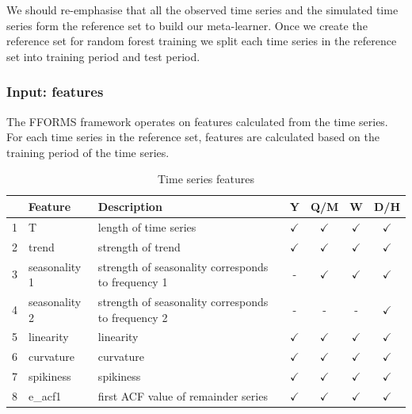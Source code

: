 \documentclass[11pt,a4paper,]{article}
\def\yes{$\checkmark$}
\begin{document}
We should re-emphasise that all the observed time series and the
simulated time series form the reference set to build our meta-learner.
Once we create the reference set for random forest training we split
each time series in the reference set into training period and test
period.

\subsubsection{Input: features}\label{input-features}

The FFORMS framework operates on features calculated from the time
series. For each time series in the reference set, features are
calculated based on the training period of the time series.

\begin{table}[!htp]
\centering\footnotesize\tabcolsep=0.12cm
\caption{Time series features}
\label{feature}
\begin{tabular}{llp{}cccc}
\toprule
\multicolumn{2}{c}{Feature} & Description & Y & Q/M & W & D/H\\
\midrule
1  & T              & length of time series                                                                   & \yes  & \yes & \yes & \yes\\
2  & trend          & strength of trend                                                                       & \yes  & \yes & \yes & \yes\\
3  & seasonality 1    & strength of seasonality corresponds to frequency 1                                                              & -     & \yes & \yes & \yes\\
4  & seasonality 2    & strength of seasonality corresponds to frequency 2                                                              & -     & - & -& \yes\\
5  & linearity      & linearity                                                                               & \yes  & \yes & \yes & \yes\\
6  & curvature      & curvature                                                                               & \yes  & \yes & \yes & \yes\\
7  & spikiness      & spikiness                                                                               & \yes  & \yes & \yes & \yes\\
8  & e\_acf1        & first ACF value of remainder series                                                     & \yes  & \yes & \yes & \yes\\

\end{tabular}
\end{table}
\end{document}
